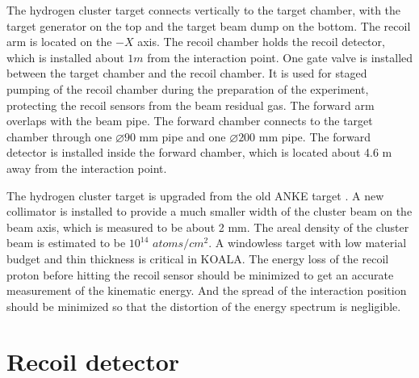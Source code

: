 \documentclass[number]{elsarticle}
\begin{document}
The hydrogen cluster target connects vertically to the target chamber, with the target generator on the top and the target beam dump on the bottom.
The recoil arm is located on the \(-X\) axis. The recoil chamber holds the recoil detector, which is installed about \(1m\) from the interaction point.
One gate valve is installed between the target chamber and the recoil chamber. 
It is used for staged pumping of the recoil chamber during the preparation of the experiment, protecting the recoil sensors from the beam residual gas.
The forward arm overlaps with the beam pipe. The forward chamber connects to the target chamber through one \(\diameter 90\) mm pipe and one \(\diameter 200\) mm pipe. 
The forward detector is installed inside the forward chamber, which is located about 4.6 m away from the interaction point.

The hydrogen cluster target is upgraded from the old ANKE target \cite{cluster_target}.
A new collimator is installed to provide a much smaller width of the cluster beam on the beam axis, which is measured to be about 2 mm.
The areal density of the cluster beam is estimated to be \(10^{14}\) \(atoms/cm^2\).
A windowless target with low material budget and thin thickness is critical in KOALA.
The energy loss of the recoil proton before hitting the recoil sensor should be minimized to get an accurate measurement of the kinematic energy.
And the spread of the interaction position should be minimized so that the distortion of the energy spectrum is negligible. 

\section{Recoil detector}
\label{sec:recoil}
\end{document}
